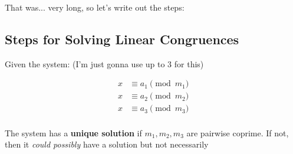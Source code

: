 \documentclass[../../Main.tex]{subfiles}
\begin{document}
That was... very long, so let's write out the steps:

\subsection{Steps for Solving Linear Congruences}

Given the system: (I'm just gonna use up to 3 for this)

\begin{align*}
    x &\equiv a_1 \pmod{m_1} \\
    x &\equiv a_2 \pmod{m_2} \\
    x &\equiv a_3 \pmod{m_3} \\
\end{align*}

The system has a \textbf{unique solution} if $m_1, m_2, m_3$ are pairwise coprime. If not, then it \textit{could possibly} have a solution but not necessarily
\end{document}
